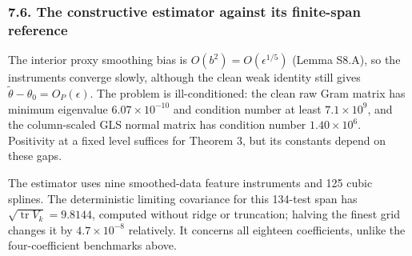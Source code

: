 \documentclass[
  american,
  11pt,
]{article}
\begin{document}
\subsubsection{7.6. The constructive estimator against its finite-span
reference}\label{the-constructive-estimator-against-its-finite-span-reference}

The interior proxy smoothing bias is \(O(b^2)=O(\epsilon^{1/5})\) (Lemma
S8.A), so the instruments converge slowly, although the clean weak
identity still gives \(\widetilde\theta-\theta_0=O_P(\epsilon)\). The
problem is ill-conditioned: the clean raw Gram matrix has minimum
eigenvalue \(6.07\times10^{-10}\) and condition number at least
\(7.1\times10^9\), and the column-scaled GLS normal matrix has condition
number \(1.40\times10^6\). Positivity at a fixed level suffices for
Theorem 3, but its constants depend on these gaps.

The estimator uses nine smoothed-data feature instruments and 125 cubic
splines. The deterministic limiting covariance for this 134-test span
has \(\sqrt{\operatorname{tr}V_k}=9.8144\), computed without ridge or
truncation; halving the finest grid changes it by \(4.7\times10^{-8}\)
relatively. It concerns all eighteen coefficients, unlike the
four-coefficient benchmarks above.
\end{document}
